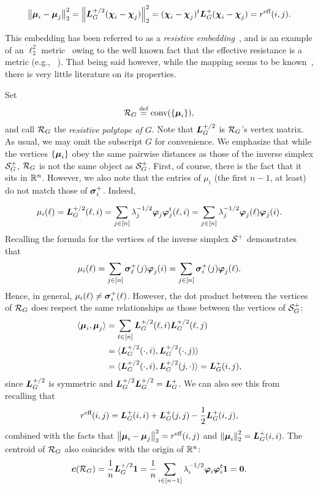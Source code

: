 \begin{equation*}
\norm{\vb*{\mu}_i-\vb*{\mu}_j}_2^2 = \norm{\vb*{L}_G^{+/2}(\boldsymbol{\chi}_i-\boldsymbol{\chi}_j)}_2^2 =  (\boldsymbol{\chi}_i-\boldsymbol{\chi}_j)^t \vb*{L}_G^+(\boldsymbol{\chi}_i-\boldsymbol{\chi}_j)=r^{\textnormal{eff}}(i,j).
\end{equation*}

This embedding has been referred to as a \emph{resistive embedding}~\cite{shayanNotes,ding2011cover}, and is an example of an $\ell_2^2$ metric~\cite{arora2009expander} owing  to the well known fact that the effective resistance is a metric (e.g., ~\cite{klein1993resistance}). That being said however, while the mapping seems to be known~\cite{ghosh2008minimizing}, there is very little literature on its properties. 

Set 
\begin{equation}
\label{eq:res_pol}
\mathcal{R}_G \overset{\text{def}}{=} \textnormal{conv}(\{\vb*{\mu}_i\}),
\end{equation}
and  call  $\mathcal{R}_G$ the \emph{resistive polytope of $G$}. Note that $\vb*{L}_G^{+/2}$ is $\mathcal{R}_G$'s vertex matrix. As usual, we may omit the subscript $G$ for convenience. We emphasize that while the vertices $\{\vb*{\mu}_i\}$ obey the same pairwise  distances as  those of the inverse simplex $\mathcal{S}_G^+$, $\mathcal{R}_G$  is not the same object as $\mathcal{S}_G^+$. First, of course, there is  the fact that it sits in  $\mathbb{R}^n$. However,  we also note that the entries of $\mu_i$ (the first $n-1$, at least) do not match those of $\vb*{\sigma}_i^+$. Indeed, 

\begin{align*}
\mu_i(\ell) = \vb*{L}_G^{+/2}(\ell,i) = \sum_{j\in[n]}\lambda_j^{-1/2}\vb*{\varphi}_j\vb*{\varphi}_j^t(\ell,i) = \sum_{j\in[n]}\lambda_j^{-1/2}\vb*{\varphi}_j(\ell)\vb*{\varphi}_j(i).
\end{align*}
Recalling the formula for the vertices of the inverse simplex $\mathcal{S}^+$ demonstrates that 
\begin{equation*}
\mu_i(\ell) = \sum_{j\in[n]}\vb*{\sigma}_\ell^+(j)\vb*{\varphi}_j(i) = \sum_{j\in[n]}\vb*{\sigma}_i^+(j)\vb*{\varphi}_j(\ell).
\end{equation*}
Hence, in general, $\mu_i(\ell)\neq \vb*{\sigma}_i^+(\ell)$. However, the dot product between the vertices of $\mathcal{R}_G$ does respect  the same relationships as those between the vertices of $\mathcal{S}_G^+$:
\begin{align*}
\langle \vb*{\mu}_i,\vb*{\mu}_j\rangle &=\sum_{\ell\in[n]} \vb*{L}_G^{+/2}(\ell,i)\vb*{L}_G^{+/2}(\ell,j) \\
&= \langle \vb*{L}_G^{+/2}(\cdot,i),\vb*{L}_G^{+/2}(\cdot,j)\rangle \\
&=\langle \vb*{L}_G^{+/2}(\cdot,i),\vb*{L}_G^{+/2}(j,\cdot)\rangle= \vb*{L}_G^+(i,j),
\end{align*}
since $\vb*{L}_G^{+/2}$ is symmetric and  $\vb*{L}_G^{+/2}\vb*{L}_G^{+/2}=\vb*{L}_G^+$.  We can also see this from recalling that 
\[r^{\textnormal{eff}}(i,j) = \vb*{L}_G^+(i,i) + \vb*{L}_G^+(j,j) - \frac{1}{2}\vb*{L}_G^+(i,j),\]
combined with the facts that $\norm{\vb*{\mu}_i-\vb*{\mu}_j}_2^2 = r^{\textnormal{eff}}(i,j)$ and $\norm{\vb*{\mu}_i}_2^2 = \vb*{L}_G^+(i,i)$. The centroid of $\mathcal{R}_G$ also coincides with the origin  of $\mathbb{R}^n$: 
\begin{equation*}
\vb*{c}(\mathcal{R}_G) = \frac{1}{n}\vb*{L}_G^{+/2}\vb{1} = \frac{1}{n}\sum_{i\in[n-1]}\lambda_i^{-1/2}\vb*{\varphi}_i\vb*{\varphi}_i^t \vb{1} = \vb{0}.
\end{equation*}

